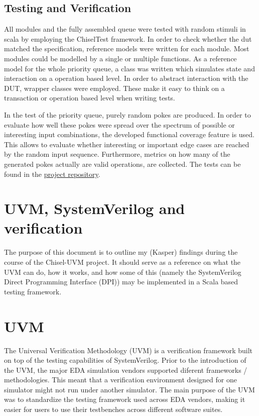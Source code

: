 \documentclass[conference]{IEEEtran}
\begin{document}
\subsection{Testing and Verification}

All modules and the fully assembled queue were tested with random stimuli in scala by employing the ChiselTest framework.
In order to check whether the dut matched the specification, reference models were written for each module. Most modules 
could be modelled by a single or multiple functions. As a reference model for the whole priority queue, a class 
was written which simulates state and interaction on a operation based level. In order to abstract interaction with the DUT,
wrapper classes were employed. These make it easy to think on a transaction or 
operation based level when writing tests.

In the test of the priority queue, purely random pokes are produced. In order to evaluate how well these pokes were spread over the spectrum 
of possible or interesting input combinations, the developed functional coverage feature is used. This allows to evaluate whether interesting 
or important edge cases are reached by the random input sequence. Furthermore, metrics on how many of the generated pokes actually are valid 
operations, are collected.
The tests can be found in the \href{https://github.com/chisel-uvm/chisel-verify/tree/master/src/test/scala/heappriorityqueue}{project repository}.


\section{UVM, SystemVerilog and verification}
The purpose of this document is to outline my (Kasper) findings during the course of the Chisel-UVM project. It should serve as a reference on what the UVM can do, how it works, and how some of this (namely the SystemVerilog Direct Programming Interface (DPI)) may be implemented in a Scala based testing framework.

\section{UVM}
The Universal Verification Methodology (UVM) is a verification framework built on top of the testing capabilities of SystemVerilog. Prior to the introduction of the UVM, the major EDA simulation vendors supported diferent frameworks / methodologies. This meant that a verification environment designed for one simulator might not run under another simulator. The main purpose of the UVM was to standardize the testing framework used across EDA vendors, making it easier for users to use their testbenches across different software suites.
\end{document}
